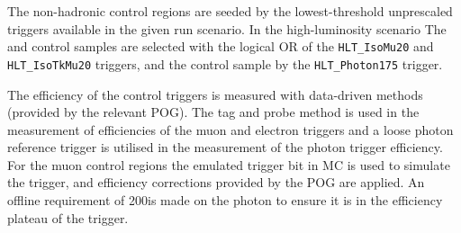 The non-hadronic control regions are seeded by the lowest-threshold unprescaled 
triggers available in the given run scenario. In the high-luminosity scenario The 
\mj and \mmj control samples are selected with the logical OR of the \verb!HLT_IsoMu20!
and \verb!HLT_IsoTkMu20!  triggers,
and the \gj control sample by the \verb!HLT_Photon175! trigger. 

The efficiency of the control triggers is measured with data-driven methods
(provided by the relevant POG). The tag and probe method is used in the measurement of
efficiencies of the muon and electron triggers and a loose photon reference trigger 
is utilised in the measurement of the photon trigger efficiency. For the muon control 
regions the emulated trigger bit in MC is used to simulate 
the trigger, and efficiency corrections provided by the POG are applied. 
An offline \Pt requirement of 200\GeV is made on the photon
to ensure it is in the efficiency plateau of the trigger.



